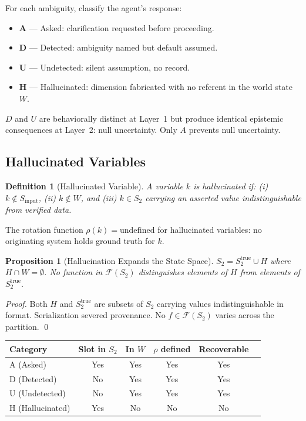 \documentclass[11pt,a4paper]{article}
\newtheorem{proposition}[theorem]{Proposition}
\newtheorem{definition}{Definition}
\begin{document}
For each ambiguity, classify the agent's response:

\begin{itemize}
  \item \textbf{A} --- Asked: clarification requested before proceeding.
  \item \textbf{D} --- Detected: ambiguity named but default assumed.
  \item \textbf{U} --- Undetected: silent assumption, no record.
  \item \textbf{H} --- Hallucinated: dimension fabricated with no 
  referent in the world state $W$.
\end{itemize}

$D$ and $U$ are behaviorally distinct at Layer~1 but produce 
identical epistemic consequences at Layer~2: null uncertainty. Only 
$A$ prevents null uncertainty.

\subsection{Hallucinated Variables}
\label{sec:hallucination}

\begin{definition}[Hallucinated Variable]
A variable $k$ is hallucinated if: (i) $k \notin S_{\text{input}}$, 
(ii) $k \notin W$, and (iii) $k \in S_2$ carrying an asserted value 
indistinguishable from verified data.
\end{definition}

The rotation function $\rho(k) = \text{undefined}$ for hallucinated 
variables: no originating system holds ground truth for $k$.

\begin{proposition}[Hallucination Expands the State Space]
\label{prop:hallucination}
$S_2 = S_2^{\text{true}} \cup H$ where $H \cap W = \emptyset$. 
No function in $\mathcal{F}(S_2)$ distinguishes elements of $H$ 
from elements of $S_2^{\text{true}}$.
\end{proposition}

\begin{proof}
Both $H$ and $S_2^{\text{true}}$ are subsets of $S_2$ carrying 
values indistinguishable in format. Serialization severed provenance. 
No $f \in \mathcal{F}(S_2)$ varies across the partition. \qed
\end{proof}

\begin{center}\small
\begin{tabular}{lccccc}
\toprule
\textbf{Category} & \textbf{Slot in $S_2$} & \textbf{In $W$} 
& \textbf{$\rho$ defined} & \textbf{Recoverable} \\
\midrule
A (Asked)        & Yes & Yes & Yes & Yes \\
D (Detected)     & No  & Yes & Yes & Yes \\
U (Undetected)   & No  & Yes & Yes & Yes \\
H (Hallucinated) & Yes & No  & No  & No \\
\bottomrule
\end{tabular}
\end{center}
\end{document}
